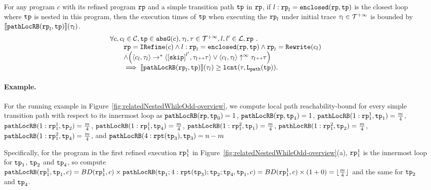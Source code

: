 \begin{lem}
  \label{lem:pathlocalrb-sound}
  For any program $c$ with its refined program $\mathtt{rp}$ and a simple transition path $\mathtt{tp}$ in $\mathtt{rp}$,
  if $l: \mathtt{rp}_l = \mathtt{enclosed}(\mathtt{rp}, \mathtt{tp})$ is the closest loop where $\mathtt{tp}$ is nested in this program,
  then the execution times of $\mathtt{tp}$ when executing the $\mathtt{rp}_l$ under initial trace $\mathtt{\tau}_l \in \mathcal{T}^{+\infty}$ is bounded by $\llbracket \mathtt{pathLocRB}(\mathtt{rp}_l, \mathtt{tp}) \rrbracket(\mathtt{\tau}_l)$.
  \[
    \begin{array}{l}
    \forall c, c_l \in \cdom, \tpath \in \absG(c), 
    \trace_l, \trace \in \tdom, l, l' \in \ldom, \rprog \st 
    \\ \qquad
    \rprog = \kw{IRefine}(c)
    \land
    l: \rprog_l = \kw{enclosed}(\rprog, \tpath)
    \land 
    \rprog_l = \algrewrite(c_l)
    \\ \qquad
    \land
    \Big(
    \config{c_l, \trace_l} \rightarrow^* \config{\clabel{\eskip}^{l'}, \trace_l \tracecat \trace}
    \lor \config{c_l, \trace_l} \uparrow^{\infty} \trace_l \tracecat \trace 
    \Big)
    \\ \qquad
    \implies
    \econfig{\outinB(\rprog_l, \tpath)}(\trace_l) \geq \lcounter(\trace, \pathl(\tpath)).
    \end{array}
  \]  
\end{lem}


\paragraph{Example.}
For the running example in Figure~\ref{fig:relatedNestedWhileOdd-overview}, 
we compute local path reachability-bound for every simple transition path with respect to its innermost loop as
$\mathtt{pathLocRB}(\mathtt{rp}, \mathtt{tp}_0) = 1$,
$\mathtt{pathLocRB}(\mathtt{rp}, \mathtt{tp}_4) = 1$,
$\mathtt{pathLocRB}(1: \mathtt{rp}_1^1, \mathtt{tp}_1) = \frac{m}{4}$,
$\mathtt{pathLocRB}(1: \mathtt{rp}_1^1, \mathtt{tp}_2) = \frac{m}{4}$,
$\mathtt{pathLocRB}(1: \mathtt{rp}_1^1, \mathtt{tp}_4) = \frac{m}{4}$,
$\mathtt{pathLocRB}(1: \mathtt{rp}_1^2, \mathtt{tp}_1) = \frac{m}{4}$,
$\mathtt{pathLocRB}(1: \mathtt{rp}_1^2, \mathtt{tp}_2) = \frac{m}{4}$,
$\mathtt{pathLocRB}(1: \mathtt{rp}_1^2, \mathtt{tp}_4) = \frac{m}{4}$, and
$\mathtt{pathLocRB}(4: \mathtt{rpt}(\mathtt{tp}_3), \mathtt{tp}_3) = n - m$ 

Specifically, for the program in the first refined execution $\mathtt{rp}_1^1$ in Figure~\ref{fig:relatedNestedWhileOdd-overview}(a), $\mathtt{rp}_1^1$ is the innermost loop for $\mathtt{tp}_1$, $\mathtt{tp}_2$ and $\mathtt{tp}_4$, 
so compute $\mathtt{pathLocRB}(\mathtt{rp}_1^1, \mathtt{tp}_1, c) = BD(\mathtt{rp}_1^1, c) \times \mathtt{pathLocRB}(\mathtt{tp}_1; 4:\mathtt{rpt}(\mathtt{tp}_3); \mathtt{tp}_2; \mathtt{tp}_4, \mathtt{tp}_1, c)
= BD(\mathtt{rp}_1^1, c) \times (1 + 0) = \lfloor \frac{m}{4} \rfloor $ and the same for $\mathtt{tp}_2$ and $\mathtt{tp}_4$.


